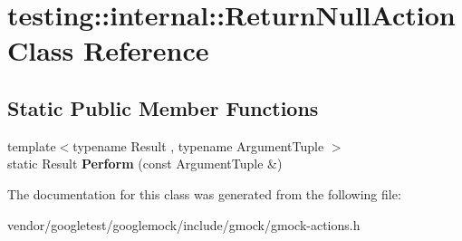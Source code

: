 \hypertarget{classtesting_1_1internal_1_1_return_null_action}{}\section{testing\+:\+:internal\+:\+:Return\+Null\+Action Class Reference}
\label{classtesting_1_1internal_1_1_return_null_action}
\subsection*{Static Public Member Functions}
\begin{DoxyCompactItemize}
\item 
\mbox{\label{classtesting_1_1internal_1_1_return_null_action_a6ce1fba236686df93070320b399e4f32}} 
{\footnotesize template$<$typename Result , typename Argument\+Tuple $>$ }\\static Result {\bfseries Perform} (const Argument\+Tuple \&)
\end{DoxyCompactItemize}


The documentation for this class was generated from the following file\+:\begin{DoxyCompactItemize}
\item 
vendor/googletest/googlemock/include/gmock/gmock-\/actions.\+h\end{DoxyCompactItemize}
